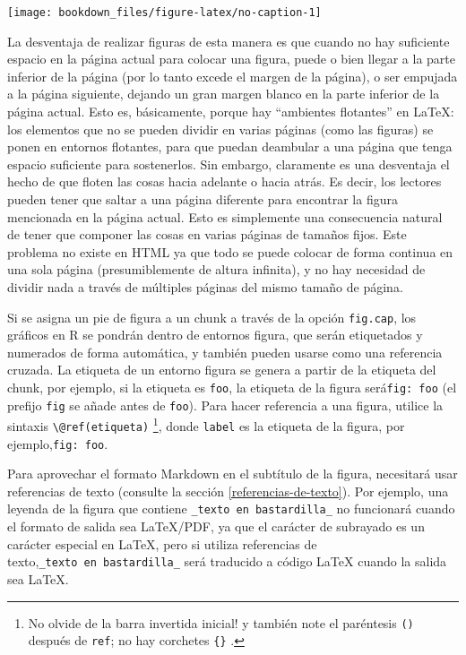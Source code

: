 \documentclass[12pt,]{krantz}
\theoremstyle{definition}
\theoremstyle{definition}
\theoremstyle{definition}
\theoremstyle{remark}
\begin{document}
\begin{center}\texttt{[image: bookdown\_files/figure-latex/no-caption-1]} \end{center}

La desventaja de realizar figuras de esta manera es que cuando no hay
suficiente espacio en la página actual para colocar una figura, puede o
bien llegar a la parte inferior de la página (por lo tanto excede el
margen de la página), o ser empujada a la página siguiente, dejando un
gran margen blanco en la parte inferior de la página actual. Esto es,
básicamente, porque hay ``ambientes flotantes'' en LaTeX: los elementos
que no se pueden dividir en varias páginas (como las figuras) se ponen
en entornos flotantes, para que puedan deambular a una página que tenga
espacio suficiente para sostenerlos. Sin embargo, claramente es una
desventaja el hecho de que floten las cosas hacia adelante o hacia
atrás. Es decir, los lectores pueden tener que saltar a una página
diferente para encontrar la figura mencionada en la página actual. Esto
es simplemente una consecuencia natural de tener que componer las cosas
en varias páginas de tamaños fijos. Este problema no existe en HTML ya
que todo se puede colocar de forma continua en una sola página
(presumiblemente de altura infinita), y no hay necesidad de dividir nada
a través de múltiples páginas del mismo tamaño de página.

Si se asigna un pie de figura a un chunk a través de la opción
\texttt{fig.cap}, los gráficos en R se pondrán dentro de entornos
figura, que serán etiquetados y numerados de forma automática, y también
pueden usarse como una referencia cruzada. La etiqueta de un entorno
figura se genera a partir de la etiqueta del chunk, por ejemplo, si la
etiqueta es \texttt{foo}, la etiqueta de la figura
será\texttt{fig:\ foo} (el prefijo \texttt{fig} se añade antes de
\texttt{foo}). Para hacer referencia a una figura, utilice la sintaxis
\texttt{\textbackslash{}@ref(etiqueta)} \footnote{No olvide de la barra
  invertida inicial! y también note el paréntesis \texttt{()} después de
  \texttt{ref}; no hay corchetes \texttt{\{\}} .}, donde \texttt{label}
es la etiqueta de la figura, por ejemplo,\texttt{fig:\ foo}.

Para aprovechar el formato Markdown en el subtítulo de la figura,
necesitará usar referencias de texto (consulte la sección
\ref{referencias-de-texto}). Por ejemplo, una leyenda de la figura que
contiene \texttt{\_texto\ en\ bastardilla\_} no funcionará cuando el
formato de salida sea LaTeX/PDF, ya que el carácter de subrayado es un
carácter especial en LaTeX, pero si utiliza referencias de
texto,\texttt{\_texto\ en\ bastardilla\_} será traducido a código LaTeX
cuando la salida sea LaTeX.
\end{document}
